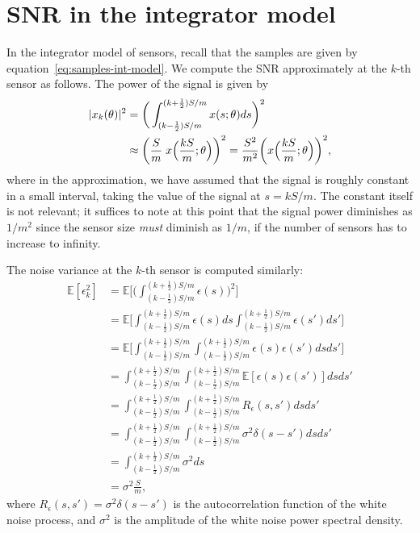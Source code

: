 \documentclass[conference]{IEEEtran}
\DeclarePairedDelimiter\abs{\lvert}{\rvert}
\begin{document}
\appendices

\section{SNR in the integrator model}
\label{app:integrator-snr}

In the integrator model of sensors, recall that the samples are given by
equation~\eqref{eq:samples-int-model}. We compute the SNR approximately at the
$k$-th sensor as follows. The power of the signal is given by
\begin{align}
	\abs{x_k(\theta)}^2 &= \bigg(\int_{(k-\frac{1}{2})S/m}^{(k+\frac{1}{2})S/m} x(s;\theta) ds\bigg)^2 \\
	&\approx \bigg(\frac{S}{m} \; x\Big(\frac{kS}{m}; \theta\Big)\bigg)^2 = \frac{S^2}{m^2} \bigg(x\Big(\frac{kS}{m}; \theta\Big)\bigg)^2 \label{eq:signal-power-k},
\end{align}
where in the approximation, we have assumed that the signal is roughly constant
in a small interval, taking the value of the signal at $s = kS/m$. The constant
itself is not relevant; it suffices to note at this point that the signal power
diminishes as $1/m^2$ since the sensor size \emph{must} diminish as $1/m$, if
the number of sensors has to increase to infinity.

The noise variance at the $k$-th sensor is computed similarly:
\begin{align}
	\mathbb E[\epsilon_k^2] &= \mathbb E \Bigg[ \bigg(\int_{(k-\frac{1}{2})S/m}^{(k+\frac{1}{2})S/m} \epsilon(s)\bigg)^2 \Bigg] \\
	&= \mathbb E \Bigg[ \int_{(k-\frac{1}{2})S/m}^{(k+\frac{1}{2})S/m} \epsilon(s) ds \int_{(k-\frac{1}{2})S/m}^{(k+\frac{1}{2})S/m} \epsilon(s') ds' \Bigg] \\
	&= \mathbb E \Bigg[ \int_{(k-\frac{1}{2})S/m}^{(k+\frac{1}{2})S/m} \int_{(k-\frac{1}{2})S/m}^{(k+\frac{1}{2})S/m} \epsilon(s) \epsilon(s') ds ds' \Bigg] \\
	&= \int_{(k-\frac{1}{2})S/m}^{(k+\frac{1}{2})S/m} \int_{(k-\frac{1}{2})S/m}^{(k+\frac{1}{2})S/m} \mathbb E[\epsilon(s) \epsilon(s')] ds ds' \\
	&= \int_{(k-\frac{1}{2})S/m}^{(k+\frac{1}{2})S/m} \int_{(k-\frac{1}{2})S/m}^{(k+\frac{1}{2})S/m} R_\epsilon(s, s') ds ds' \\
	&= \int_{(k-\frac{1}{2})S/m}^{(k+\frac{1}{2})S/m} \int_{(k-\frac{1}{2})S/m}^{(k+\frac{1}{2})S/m} \sigma^2 \delta(s - s') ds ds' \\
	&= \int_{(k-\frac{1}{2})S/m}^{(k+\frac{1}{2})S/m} \sigma^2 ds \\
	&= \sigma^2 \frac{S}{m}, \label{eq:noise-var-k}
\end{align}
where $R_\epsilon(s, s') = \sigma^2 \delta(s - s')$ is the autocorrelation
function of the white noise process, and $\sigma^2$ is the amplitude of the
white noise power spectral density.
\end{document}
